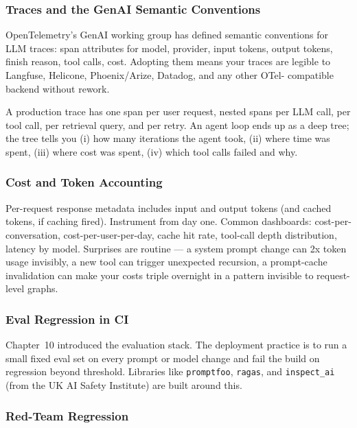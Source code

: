 \subsubsection{Traces and the GenAI Semantic Conventions}

OpenTelemetry's GenAI working group has defined semantic
conventions \citep{otel_genai} for LLM traces: span attributes
for model, provider, input tokens, output tokens, finish reason,
tool calls, cost. Adopting them means your traces are legible to
Langfuse, Helicone, Phoenix/Arize, Datadog, and any other OTel-
compatible backend without rework.

A production trace has one span per user request, nested spans
per LLM call, per tool call, per retrieval query, and per retry.
An agent loop ends up as a deep tree; the tree tells you (i) how
many iterations the agent took, (ii) where time was spent, (iii)
where cost was spent, (iv) which tool calls failed and why.

\subsubsection{Cost and Token Accounting}

Per-request response metadata includes input and output tokens
(and cached tokens, if caching fired). Instrument from day one.
Common dashboards: cost-per-conversation, cost-per-user-per-day,
cache hit rate, tool-call depth distribution, latency by model.
Surprises are routine --- a system prompt change can 2x token
usage invisibly, a new tool can trigger unexpected recursion,
a prompt-cache invalidation can make your costs triple overnight
in a pattern invisible to request-level graphs.

\subsubsection{Eval Regression in CI}

Chapter~10 introduced the evaluation stack. The deployment practice
is to run a small fixed eval set on every prompt or model change
and fail the build on regression beyond threshold. Libraries like
\texttt{promptfoo}, \texttt{ragas}, and \texttt{inspect\_ai}
(from the UK AI Safety Institute) are built around this.

\subsubsection{Red-Team Regression}

